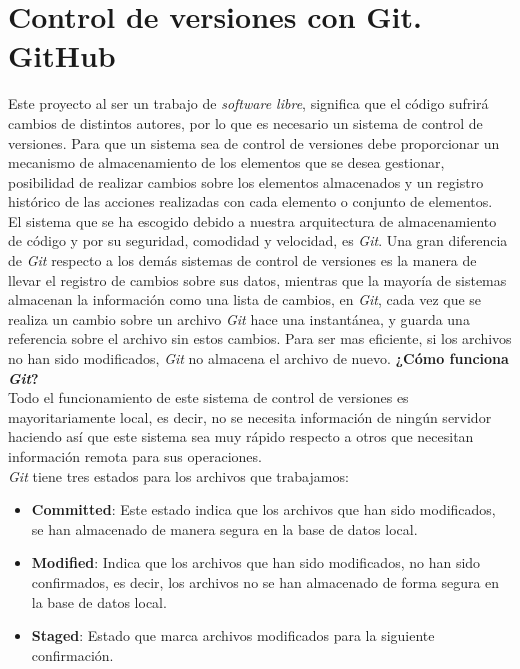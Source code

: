 \documentclass[a4paper, 12pt]{book}
\begin{document}
\section{Control de versiones con Git. GitHub}
\label{sec:git}
Este proyecto al ser un trabajo de \emph{software libre}, significa que el código sufrirá cambios de distintos autores, por lo que es necesario un sistema de control de versiones. Para que un sistema sea de control de versiones debe proporcionar un mecanismo de almacenamiento de los elementos que se desea gestionar, posibilidad de realizar cambios sobre los elementos almacenados y un registro histórico de las acciones realizadas con cada elemento o conjunto de elementos. \\
El sistema que se ha escogido debido a nuestra arquitectura de almacenamiento de código y por su seguridad, comodidad y velocidad, es \emph{Git}. Una gran diferencia de \emph{Git} respecto a los demás sistemas de control de versiones es la manera de llevar el registro de cambios sobre sus datos, mientras que la mayoría de sistemas almacenan la información como una lista de cambios, en \emph{Git}, cada vez que se realiza un cambio sobre un archivo \emph{Git} hace una instantánea, y guarda una referencia sobre el archivo sin estos cambios. Para ser mas eficiente, si los archivos no han sido modificados, \emph{Git} no almacena el archivo de nuevo. %
\textbf{¿Cómo funciona \emph{Git}?}\\
Todo el funcionamiento de este sistema de control de versiones es mayoritariamente local, es decir, no se necesita información de ningún servidor haciendo así que este sistema sea muy rápido respecto a otros que necesitan información remota para sus operaciones. \\
\emph{Git} tiene tres estados para los archivos que trabajamos:
\begin{itemize}
    \item \textbf{Committed}: Este estado indica que los archivos que han sido modificados, se han almacenado de manera segura en la base de datos local.
    \item \textbf{Modified}: Indica que los archivos que han sido modificados, no han sido confirmados, es decir, los archivos no se han almacenado de forma segura en la base de datos local.
    \item \textbf{Staged}: Estado que marca archivos modificados para la siguiente confirmación. 
\end{itemize}
\end{document}
